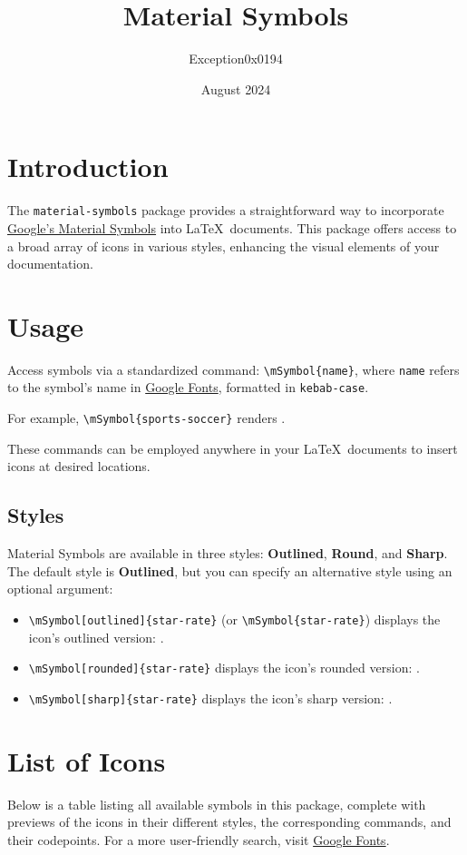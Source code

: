 \documentclass[11pt]{article}
\title{Material Symbols}
\date{August 2024}
\author{Exception0x0194}
\begin{document}
\maketitle

\section{Introduction}

The \texttt{material-symbols} package provides a straightforward way to incorporate \href{https://fonts.google.com/icons}{Google's Material Symbols} into \LaTeX\ documents. This package offers access to a broad array of icons in various styles, enhancing the visual elements of your documentation.

\section{Usage}

Access symbols via a standardized command: \texttt{\textbackslash mSymbol\{name\}}, where \texttt{name} refers to the symbol's name in \href{https://fonts.google.com/icons}{Google Fonts}, formatted in \texttt{kebab-case}.

For example, \texttt{\textbackslash mSymbol\{sports-soccer\}} renders .

These commands can be employed anywhere in your \LaTeX\ documents to insert icons at desired locations.

\subsection{Styles}

Material Symbols are available in three styles: \textbf{Outlined}, \textbf{Round}, and \textbf{Sharp}. The default style is \textbf{Outlined}, but you can specify an alternative style using an optional argument:

\begin{itemize}
    \item \texttt{\textbackslash mSymbol[outlined]\{star-rate\}} (or \texttt{\textbackslash mSymbol\{star-rate\}}) displays the icon's outlined version: .
    \item \texttt{\textbackslash mSymbol[rounded]\{star-rate\}} displays the icon's rounded version: .
    \item \texttt{\textbackslash mSymbol[sharp]\{star-rate\}} displays the icon's sharp version: .
\end{itemize}

\section{List of Icons}

Below is a table listing all available symbols in this package, complete with previews of the icons in their different styles, the corresponding commands, and their codepoints. For a more user-friendly search, visit \href{https://fonts.google.com/icons}{Google Fonts}.


\end{document}
